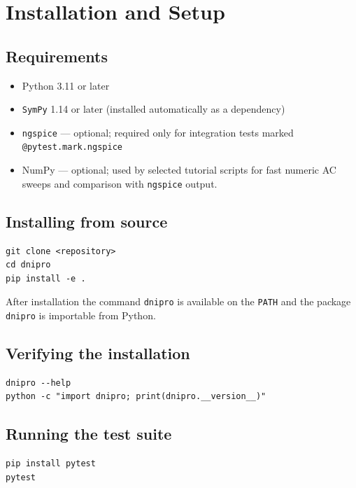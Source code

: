 \documentclass[11pt,a4paper]{article}
\newcommand{\code}[1]{\texttt{#1}}
\newcommand{\sympy}{\texttt{SymPy}}
\newcommand{\ngspice}{\texttt{ngspice}}
\begin{document}
\section{Installation and Setup}
\label{sec:installation}

\subsection{Requirements}

\begin{itemize}[noitemsep]
    \item Python 3.11 or later
    \item \sympy{} 1.14 or later (installed automatically as a dependency)
    \item \ngspice{} — optional; required only for integration tests marked
          \code{@pytest.mark.ngspice}
    \item NumPy --- optional; used by selected tutorial scripts for fast numeric
          AC sweeps and comparison with \ngspice{} output.
\end{itemize}

\subsection{Installing from source}

\begin{lstlisting}[style=shell]
git clone <repository>
cd dnipro
pip install -e .
\end{lstlisting}

After installation the command \code{dnipro} is available on the \code{PATH}
and the package \code{dnipro} is importable from Python.

\subsection{Verifying the installation}

\begin{lstlisting}[style=shell]
dnipro --help
python -c "import dnipro; print(dnipro.__version__)"
\end{lstlisting}

\subsection{Running the test suite}

\begin{lstlisting}[style=shell]
pip install pytest
pytest
\end{lstlisting}
\end{document}
